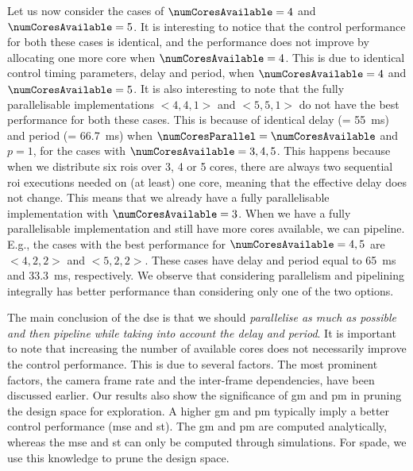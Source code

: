 Let us now consider the cases of $\numCoresAvailable=4$ and $\numCoresAvailable=5$.
It is interesting to notice that the control performance for both these cases is identical, and the performance does not improve by allocating one more core when $\numCoresAvailable=4$.
This is due to identical control timing parameters, delay and period, when $\numCoresAvailable=4$ and $\numCoresAvailable=5$.
It is also interesting to note that the fully parallelisable implementations $<4,4,1>$ and $<5,5,1>$ do not have the best performance for both these cases. 
This is because of identical delay (= 55~ms) and period (= 66.7~ms) when $\numCoresParallel=\numCoresAvailable$ and $p=1$, for the cases with $\numCoresAvailable={3,4,5}$.
This happens because when we distribute six \glspl{roi} over 3, 4 or 5 cores, there are always two sequential \gls{roi} executions needed on (at least) one core, meaning that the effective delay does not change. 
This means that we already have a fully parallelisable implementation with $\numCoresAvailable=3$. 
When we have a fully parallelisable implementation and still have more cores available, we can pipeline.
E.g., the cases with the best performance for $\numCoresAvailable={4,5}$ are $<4,2,2>$ and $<5,2,2>$. These cases have delay and period equal to 65~ms and 33.3~ms, respectively. 
We observe that considering parallelism and pipelining integrally has better performance than considering only one of the two options.

The main conclusion of the \gls{dse} is that we should \textit{parallelise as much as possible and then pipeline while taking into account the delay and period}. 
It is important to note that increasing the number of available cores does not necessarily improve the control performance. This is due to several factors. The most prominent factors, the camera frame rate and the inter-frame dependencies, have been discussed earlier.
Our results also show the significance of \gls{gm} and \gls{pm} in pruning the design space for exploration.
A higher \gls{gm} and \gls{pm} typically imply a better control performance (\gls{mse} and \gls{st}).
The \gls{gm} and \gls{pm} are computed analytically, whereas the \gls{mse} and \gls{st} can only be computed through simulations.
For \gls{spade}, we use this knowledge to prune the design space.

